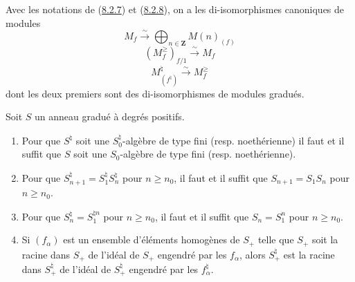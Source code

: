 \begin{lemma}[8.2.9]
\label{II.8.2.9-fr}
Avec les notations de (\hyperref[II.8.2.7-fr]{8.2.7}) et
(\hyperref[II.8.2.8-fr]{8.2.8}), on a les di-isomorphismes canoniques de
modules
\begin{equation}
\label{II.8.2.9.1-fr}
  M_f\xrightarrow{\sim}\bigoplus_{n\in\mathbf{Z}}M(n)_{(f)}
\tag{8.2.9.1}
\end{equation}
\begin{equation}
\label{II.8.2.9.2-fr}
  (M_f^{\geq})_{f/1}\xrightarrow{\sim}M_f
\tag{8.2.9.2}
\end{equation}
\begin{equation}
\label{II.8.2.9.3-fr}
  M^\natural_{(f^\natural)}\xrightarrow{\sim}M_f^{\geq}
\tag{8.2.9.3}
\end{equation}
dont les deux premiers sont des di-isomorphismes de modules gradués.
\end{lemma}

\begin{lemma}[8.2.10]
\label{II.8.2.10-fr}
Soit $S$ un anneau gradué à degrés positifs.
\begin{enumerate}
\item[\rm(i)] Pour que $S^\natural$ soit une $S_0^\natural$-algèbre de type
fini (resp. noethérienne) il faut et il suffit que $S$ soit une $S_0$-algèbre
de type fini (resp. noethérienne).
\item[\rm(ii)] Pour que $S_{n+1}^\natural=S_1^\natural S_n^\natural$ pour
$n\geq n_0$, il faut et il suffit que $S_{n+1}=S_1S_n$ pour $n\geq n_0$.
\item[\rm(iii)] Pour que $S_n^\natural=S_1^{\natural n}$ pour $n\geq n_0$, il
faut et il suffit que $S_n=S_1^n$ pour $n\geq n_0$.
\item[\rm(iv)] Si $(f_\alpha)$ est un ensemble d'éléments homogènes de $S_+$
telle que $S_+$ soit la racine dans $S_+$ de l'idéal de $S_+$ engendré par
les $f_\alpha$, alors $S_+^\natural$ est la racine dans $S_+^\natural$ de
l'idéal de $S_+^\natural$ engendré par les $f_\alpha^\natural$.
\end{enumerate}
\end{lemma}

